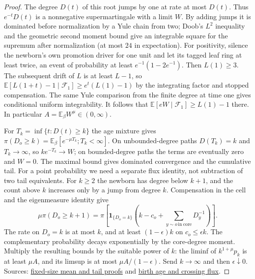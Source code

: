 \documentclass[11pt]{article}
\newcommand{\proofsrc}[2]{\href{https://github.com/uzay-eth/friend-tree-exponent/blob/a0972085ad72ad5685ae7b424988648d1965e73c/#1}{#2}}
\theoremstyle{remark}
\numberwithin{equation}{section}
\begin{document}
\begin{proof}
The degree $D(t)$ of this root jumps by one at rate at most $D(t)$. Thus $e^{-t}D(t)$ is a nonnegative supermartingale with a limit $W$. By adding jumps it is dominated before normalization by a Yule chain from two; Doob's $L^2$ inequality and the geometric second moment bound give an integrable square for the supremum after normalization (at most $24$ in expectation). For positivity, silence the newborn's own promotion driver for one unit and let its tagged leaf ring at least twice, an event of probability at least $e^{-1}(1-2e^{-1})$. Then $L(1)\ge3$. The subsequent drift of $L$ is at least $L-1$, so $\mathbb E[L(1+t)-1\mid\mathcal F_1]\ge e^t(L(1)-1)$ by the integrating factor and stopped compensation. The same Yule comparison from the finite degree at time one gives conditional uniform integrability. It follows that $\mathbb E[eW\mid\mathcal F_1]\ge L(1)-1$ there. In particular $A=\mathbb E_\beta W^\mu\in(0,\infty)$.

For $T_k=\inf\{t:D(t)\ge k\}$ the age mixture gives $\pi(D_o\ge k)=\mathbb E_\beta[e^{-\mu T_k};T_k<\infty]$. On unbounded-degree paths $D(T_k)=k$ and $T_k\to\infty$, so $ke^{-T_k}\to W$; on bounded-degree paths the terms are eventually zero and $W=0$. The maximal bound gives dominated convergence and the cumulative tail. For a point probability we need a separate flux identity, not subtraction of two tail equivalents. For $k\ge2$ the newborn has degree below $k+1$, and the count above $k$ increases only by a jump from degree $k$. Compensation in the cell and the eigenmeasure identity give
\[
 \mu\pi(D_o\ge k+1)
 =\pi\left[\mathbf1_{\{D_o=k\}}\left(k-c_o+\sum_{y\sim o\,\mathrm{in\ core}}D_y^{-1}\right)\right].
\]
The rate on $D_o=k$ is at most $k$, and at least $(1-\epsilon)k$ on $c_o\le\epsilon k$. The complementary probability decays exponentially by the core-degree moment. Multiply the resulting bounds by the suitable power of $k$: the liminf of $k^{1+\mu}p_k$ is at least $\mu A$, and its limsup is at most $\mu A/(1-\epsilon)$. Send $k\to\infty$ and then $\epsilon\downarrow0$. Sources: \proofsrc{round2/proofs/astra/source/round2/standalone/claim-3.md}{fixed-size mean and tail proofs} and \proofsrc{round2/proofs/astra/source/round2/degree-law.md}{birth age and crossing flux}.
\end{proof}
\end{document}
